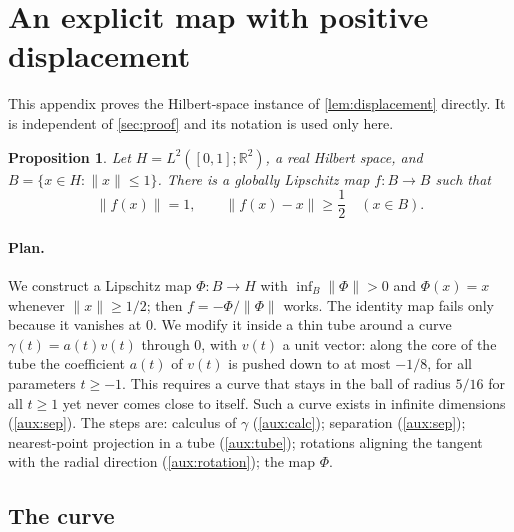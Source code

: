 \documentclass[11pt]{article}
\newcommand{\R}{\mathbb R}
\newcommand{\norm}[1]{\lVert #1\rVert}
\newtheorem{proposition}[theorem]{Proposition}
\theoremstyle{definition}
\numberwithin{equation}{section}
\begin{document}
\appendix
\section{An explicit map with positive displacement}\label{app:auxiliary}

This appendix proves the Hilbert-space instance of
\cref{lem:displacement} \cite{BenyaminiSternfeld1983} directly. It is
independent of \cref{sec:proof} and its notation is used only here.

\begin{proposition}\label{aux:map}
Let \(H=L^2([0,1];\R^2)\), a real Hilbert space, and
\(B=\{x\in H:\norm{x}\le1\}\). There is a globally Lipschitz map
\(f:B\to B\) such that
\[
  \norm{f(x)}=1,
  \qquad \norm{f(x)-x}\ge\frac12
  \quad(x\in B).
\]
\end{proposition}

\paragraph{Plan.}
We construct a Lipschitz map \(\Phi:B\to H\) with
\(\inf_B\norm{\Phi}>0\) and \(\Phi(x)=x\) whenever \(\norm{x}\ge1/2\); then
\(f=-\Phi/\norm{\Phi}\) works. The identity map fails only because it vanishes
at \(0\). We modify it inside a thin tube around a curve
\(\gamma(t)=a(t)v(t)\) through \(0\), with \(v(t)\) a unit vector: along the
core of the tube the coefficient \(a(t)\) of \(v(t)\) is pushed down to at
most \(-1/8\), for all parameters \(t\ge-1\). This requires a curve that
stays in the ball of radius \(5/16\) for all \(t\ge1\) yet never comes close
to itself. Such a curve exists in infinite dimensions (\cref{aux:sep}). The
steps are: calculus of \(\gamma\) (\cref{aux:calc}); separation
(\cref{aux:sep}); nearest-point projection in a tube (\cref{aux:tube});
rotations aligning the tangent with the radial direction
(\cref{aux:rotation}); the map \(\Phi\).

\subsection{The curve}
\end{document}
